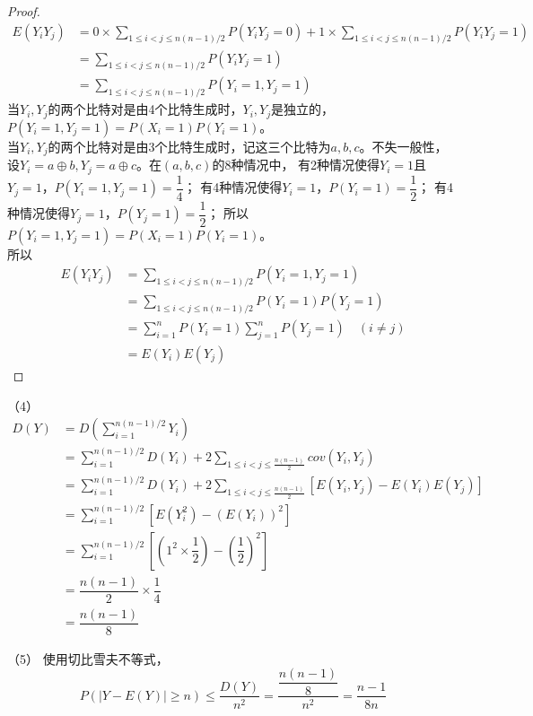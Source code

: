 \documentclass[a4papers]{ctexart}
\begin{document}
\begin{proof}
\begin{align*}
    E(Y_iY_j)&=0\times \sum_{1\le i < j\le n(n-1)/2} P(Y_iY_j=0)+1\times \sum_{1\le i < j\le n(n-1)/2}P(Y_iY_j=1)\\
    &=\sum_{1\le i < j\le n(n-1)/2}P(Y_iY_j=1)\\
    &=\sum_{1\le i < j\le n(n-1)/2}P(Y_i=1,Y_j=1)
\end{align*}
\indent 当$Y_i,Y_j$的两个比特对是由4个比特生成时，$Y_i,Y_j$是独立的，
$P(Y_i=1,Y_j=1)=P(X_i=1)P(Y_i=1)。$\\
\indent 当$Y_i,Y_j$的两个比特对是由3个比特生成时，记这三个比特为$a,b,c$。不失一般性，
设$Y_i=a\oplus b,Y_j=a\oplus c$。在$(a,b,c)$的8种情况中，
有2种情况使得$Y_i=1$且$Y_j=1$，$P(Y_i=1,Y_j=1)=\dfrac{1}{4}$；
有4种情况使得$Y_i=1$，$P(Y_i=1)=\dfrac{1}{2}$；
有4种情况使得$Y_j=1$，$P(Y_j=1)=\dfrac{1}{2}$；
所以$P(Y_i=1,Y_j=1)=P(X_i=1)P(Y_i=1)。$\\
\indent 所以
\begin{align*}
    E(Y_iY_j)&=\sum_{1\le i < j\le n(n-1)/2}P(Y_i=1,Y_j=1)\\
    &=\sum_{1\le i < j\le n(n-1)/2}P(Y_i=1)P(Y_j=1)\\
    &=\sum_{i=1}^n P(Y_i=1) \sum_{j=1}^n P(Y_j=1) \quad (i\ne j)\\
    &=E(Y_i)E(Y_j)
\end{align*}
\end{proof}

\noindent（4）
\begin{align*}
    D(Y)&=D\left(\sum_{i=1}^{n(n-1)/2} Y_i\right)\\
    &=\sum_{i=1}^{n(n-1)/2}D(Y_i)+2\sum_{1\le i<j\le \frac{n(n-1)}{2}}cov(Y_i,Y_j)\\
    &=\sum_{i=1}^{n(n-1)/2}D(Y_i)+2\sum_{1\le i<j\le \frac{n(n-1)}{2}}[E(Y_i,Y_j)-E(Y_i)E(Y_j)]\\
    &=\sum_{i=1}^{n(n-1)/2}[E(Y_i^2)-(E(Y_i))^2]\\
    &=\sum_{i=1}^{n(n-1)/2}[(1^2\times\dfrac{1}{2})-(\dfrac{1}{2})^2]\\
    &=\dfrac{n(n-1)}{2}\times\dfrac{1}{4}\\
    &=\dfrac{n(n-1)}{8}
\end{align*}

\noindent（5）
使用切比雪夫不等式，
\[
    P\left(|Y-E(Y)|\ge n\right)\le\dfrac{D(Y)}{n^2}=\dfrac{\dfrac{n(n-1)}{8}}{n^2}=\dfrac{n-1}{8n}
    \]
\end{document}
